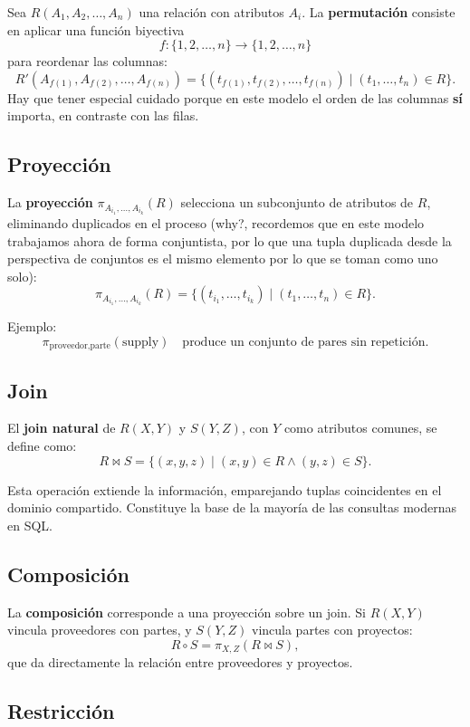 \documentclass{article}
\begin{document}
Sea $R(A_1, A_2, \ldots, A_n)$ una relación con atributos $A_i$. La \textbf{permutación} consiste en aplicar una función biyectiva
\[
f : \{1,2,\ldots,n\} \to \{1,2,\ldots,n\}
\]
para reordenar las columnas:
\[
R'(A_{f(1)}, A_{f(2)}, \ldots, A_{f(n)}) = \{ (t_{f(1)}, t_{f(2)}, \ldots, t_{f(n)}) \mid (t_1, \ldots, t_n) \in R \}.
\]
Hay que tener especial cuidado porque en este modelo el orden de las columnas \textbf{sí} importa, en contraste con las filas.


\subsection{Proyección}

La \textbf{proyección} $\pi_{A_{i_1},\ldots,A_{i_k}}(R)$ selecciona un subconjunto de atributos de $R$, eliminando duplicados en el proceso (why?, recordemos que en este modelo trabajamos ahora de forma conjuntista, por lo que una tupla duplicada desde la perspectiva de conjuntos es el mismo elemento por lo que se toman como uno solo):
\[
\pi_{A_{i_1},\ldots,A_{i_k}}(R) = \{ (t_{i_1}, \ldots, t_{i_k}) \mid (t_1,\ldots,t_n) \in R \}.
\]

Ejemplo: 
\[
\pi_{\text{proveedor}, \text{parte}}(\text{supply}) \quad \text{produce un conjunto de pares sin repetición.}
\]

\subsection{Join}

El \textbf{join natural} de $R(X,Y)$ y $S(Y,Z)$, con $Y$ como atributos comunes, se define como:
\[
R \bowtie S = \{ (x,y,z) \mid (x,y) \in R \land (y,z) \in S \}.
\]

Esta operación extiende la información, emparejando tuplas coincidentes en el dominio compartido. Constituye la base de la mayoría de las consultas modernas en SQL.

\subsection{Composición}

La \textbf{composición} corresponde a una proyección sobre un join.  
Si $R(X,Y)$ vincula proveedores con partes, y $S(Y,Z)$ vincula partes con proyectos:
\[
R \circ S = \pi_{X,Z}(R \bowtie S),
\]
que da directamente la relación entre proveedores y proyectos.

\subsection{Restricción}\label{subsec:rest}
\end{document}
